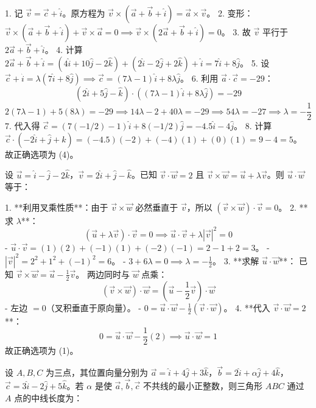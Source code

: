 \begin{questions}
\begin{solution}
1. 记 $\vec{v} = \vec{c} + \hat{i}$。原方程为 $\vec{v} \times (\vec{a} + \vec{b} + \hat{i}) = \vec{a} \times \vec{v}$。
2. 变形：$\vec{v} \times (\vec{a} + \vec{b} + \hat{i}) + \vec{v} \times \vec{a} = 0 \implies \vec{v} \times (2\vec{a} + \vec{b} + \hat{i}) = 0$。
3. 故 $\vec{v}$ 平行于 $2\vec{a} + \vec{b} + \hat{i}$。
4. 计算 $2\vec{a} + \vec{b} + \hat{i} = (4\hat{i} + 10\hat{j} - 2\hat{k}) + (2\hat{i} - 2\hat{j} + 2\hat{k}) + \hat{i} = 7\hat{i} + 8\hat{j}$。
5. 设 $\vec{c} + \hat{i} = \lambda(7\hat{i} + 8\hat{j}) \implies \vec{c} = (7\lambda-1)\hat{i} + 8\lambda\hat{j}$。
6. 利用 $\vec{a} \cdot \vec{c} = -29$：
\[ (2\hat{i} + 5\hat{j} - \hat{k}) \cdot ((7\lambda-1)\hat{i} + 8\lambda\hat{j}) = -29 \]
\[ 2(7\lambda-1) + 5(8\lambda) = -29 \implies 14\lambda - 2 + 40\lambda = -29 \implies 54\lambda = -27 \implies \lambda = -\frac{1}{2} \]
7. 代入得 $\vec{c} = (7(-1/2)-1)\hat{i} + 8(-1/2)\hat{j} = -4.5\hat{i} - 4\hat{j}$。
8. 计算 $\vec{c} \cdot (-2\hat{i} + \hat{j} + \hat{k}) = (-4.5)(-2) + (-4)(1) + (0)(1) = 9 - 4 = 5$。
故正确选项为 (4)。
\end{solution}
\question
设 $\vec{u} = \hat{i} - \hat{j} - 2\hat{k}$，$\vec{v} = 2\hat{i} + \hat{j} - \hat{k}$。已知 $\vec{v} \cdot \vec{w} = 2$ 且 $\vec{v} \times \vec{w} = \vec{u} + \lambda\vec{v}$。则 $\vec{u} \cdot \vec{w}$ 等于：

\begin{solution}
1. **利用叉乘性质**：由于 $\vec{v} \times \vec{w}$ 必然垂直于 $\vec{v}$，所以 $(\vec{v} \times \vec{w}) \cdot \vec{v} = 0$。
2. **求 $\lambda$**：
\[
(\vec{u} + \lambda\vec{v}) \cdot \vec{v} = 0 \implies \vec{u} \cdot \vec{v} + \lambda |\vec{v}|^2 = 0
\]
   - $\vec{u} \cdot \vec{v} = (1)(2) + (-1)(1) + (-2)(-1) = 2 - 1 + 2 = 3$。
   - $|\vec{v}|^2 = 2^2 + 1^2 + (-1)^2 = 6$。
   - $3 + 6\lambda = 0 \implies \lambda = -\frac{1}{2}$。
3. **求解 $\vec{u} \cdot \vec{w}$**：
   已知 $\vec{v} \times \vec{w} = \vec{u} - \frac{1}{2}\vec{v}$。
   两边同时与 $\vec{w}$ 点乘：
\[
(\vec{v} \times \vec{w}) \cdot \vec{w} = (\vec{u} - \frac{1}{2}\vec{v}) \cdot \vec{w}
\]
   - 左边 $= 0$（叉积垂直于原向量）。
   - $0 = \vec{u} \cdot \vec{w} - \frac{1}{2}(\vec{v} \cdot \vec{w})$。
4. **代入 $\vec{v} \cdot \vec{w} = 2$**：
\[
0 = \vec{u} \cdot \vec{w} - \frac{1}{2}(2) \implies \vec{u} \cdot \vec{w} = 1
\]
故正确选项为 (1)。
\end{solution}

\question
设 $A, B, C$ 为三点，其位置向量分别为 $\vec{a} = \hat{i} + 4\hat{j} + 3\hat{k}$，$\vec{b} = 2\hat{i} + \alpha\hat{j} + 4\hat{k}$，$\vec{c} = 3\hat{i} - 2\hat{j} + 5\hat{k}$。若 $\alpha$ 是使 $\vec{a}, \vec{b}, \vec{c}$ 不共线的最小正整数，则三角形 $ABC$ 通过 $A$ 点的中线长度为：


\end{questions}
